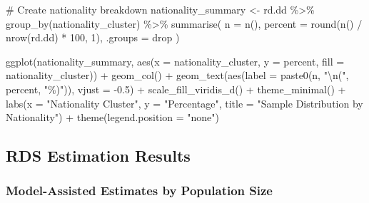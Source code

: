 \documentclass[
  12pt,
  letterpaper,
  DIV=11,
  numbers=noendperiod]{scrartcl}
\newenvironment{Shaded}{\begin{snugshade}}{\end{snugshade}}
\newcommand{\AttributeTok}[1]{\textcolor[rgb]{0.40,0.45,0.13}{#1}}
\newcommand{\CommentTok}[1]{\textcolor[rgb]{0.37,0.37,0.37}{#1}}
\newcommand{\DecValTok}[1]{\textcolor[rgb]{0.68,0.00,0.00}{#1}}
\newcommand{\FloatTok}[1]{\textcolor[rgb]{0.68,0.00,0.00}{#1}}
\newcommand{\FunctionTok}[1]{\textcolor[rgb]{0.28,0.35,0.67}{#1}}
\newcommand{\NormalTok}[1]{\textcolor[rgb]{0.00,0.23,0.31}{#1}}
\newcommand{\OtherTok}[1]{\textcolor[rgb]{0.00,0.23,0.31}{#1}}
\newcommand{\SpecialCharTok}[1]{\textcolor[rgb]{0.37,0.37,0.37}{#1}}
\newcommand{\StringTok}[1]{\textcolor[rgb]{0.13,0.47,0.30}{#1}}
\begin{document}
\begin{Shaded}
\begin{Highlighting}[]
\CommentTok{\# Create nationality breakdown}
\NormalTok{nationality\_summary }\OtherTok{\textless{}{-}}\NormalTok{ rd.dd }\SpecialCharTok{\%\textgreater{}\%}
  \FunctionTok{group\_by}\NormalTok{(nationality\_cluster) }\SpecialCharTok{\%\textgreater{}\%}
  \FunctionTok{summarise}\NormalTok{(}
    \AttributeTok{n =} \FunctionTok{n}\NormalTok{(),}
    \AttributeTok{percent =} \FunctionTok{round}\NormalTok{(}\FunctionTok{n}\NormalTok{() }\SpecialCharTok{/} \FunctionTok{nrow}\NormalTok{(rd.dd) }\SpecialCharTok{*} \DecValTok{100}\NormalTok{, }\DecValTok{1}\NormalTok{),}
    \AttributeTok{.groups =} \StringTok{\textquotesingle{}drop\textquotesingle{}}
\NormalTok{  )}

\FunctionTok{ggplot}\NormalTok{(nationality\_summary, }\FunctionTok{aes}\NormalTok{(}\AttributeTok{x =}\NormalTok{ nationality\_cluster, }\AttributeTok{y =}\NormalTok{ percent, }\AttributeTok{fill =}\NormalTok{ nationality\_cluster)) }\SpecialCharTok{+}
  \FunctionTok{geom\_col}\NormalTok{() }\SpecialCharTok{+}
  \FunctionTok{geom\_text}\NormalTok{(}\FunctionTok{aes}\NormalTok{(}\AttributeTok{label =} \FunctionTok{paste0}\NormalTok{(n, }\StringTok{"}\SpecialCharTok{\textbackslash{}n}\StringTok{("}\NormalTok{, percent, }\StringTok{"\%)"}\NormalTok{)), }\AttributeTok{vjust =} \SpecialCharTok{{-}}\FloatTok{0.5}\NormalTok{) }\SpecialCharTok{+}
  \FunctionTok{scale\_fill\_viridis\_d}\NormalTok{() }\SpecialCharTok{+}
  \FunctionTok{theme\_minimal}\NormalTok{() }\SpecialCharTok{+}
  \FunctionTok{labs}\NormalTok{(}\AttributeTok{x =} \StringTok{"Nationality Cluster"}\NormalTok{, }\AttributeTok{y =} \StringTok{"Percentage"}\NormalTok{, }
       \AttributeTok{title =} \StringTok{"Sample Distribution by Nationality"}\NormalTok{) }\SpecialCharTok{+}
  \FunctionTok{theme}\NormalTok{(}\AttributeTok{legend.position =} \StringTok{"none"}\NormalTok{)}
\end{Highlighting}
\end{Shaded}

\subsection{RDS Estimation Results}\label{rds-estimation-results}

\subsubsection{Model-Assisted Estimates by Population
Size}\label{model-assisted-estimates-by-population-size}
\end{document}

